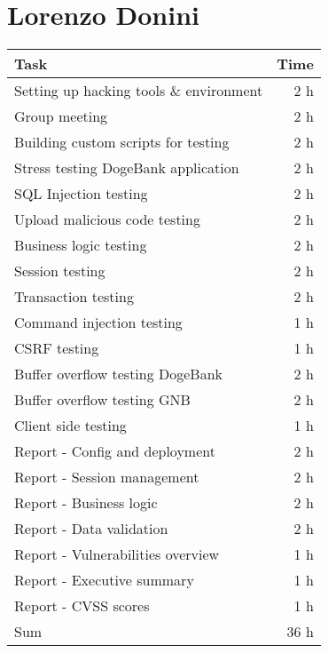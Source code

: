 \clearpage
\section*{Lorenzo Donini}
\begin{table}[h!tpb]
  \centering
  \begin{tabularx}{\textwidth}{X r}
    \toprule
      Task & Time \\
    \midrule
      Setting up hacking tools \& environment & 2 h \\
      Group meeting & 2 h \\
      Building custom scripts for testing & 2 h \\
      Stress testing DogeBank application & 2 h \\
      SQL Injection testing & 2 h \\
      Upload malicious code testing & 2 h \\
      Business logic testing & 2 h \\
      Session testing & 2 h \\
      Transaction testing & 2 h \\
      Command injection testing & 1 h \\
      CSRF testing & 1 h \\
      Buffer overflow testing DogeBank & 2 h \\
      Buffer overflow testing GNB & 2 h \\
      Client side testing & 1 h \\
      Report - Config and deployment & 2 h \\
      Report - Session management & 2 h \\
      Report - Business logic & 2 h \\
      Report - Data validation & 2 h \\
      Report - Vulnerabilities overview & 1 h \\
      Report - Executive summary & 1 h \\
      Report - CVSS scores & 1 h \\
    \midrule
      Sum & 36 h \\
    \bottomrule
  \end{tabularx}
\end{table}

\clearpage
